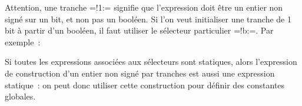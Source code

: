 Attention, une tranche \plm=!1:= signifie que l'expression doit être un entier non signé sur un bit, et non pas un booléen. Si l'on veut initialiser une tranche de 1 bit à partir d'un booléen, il faut utiliser le sélecteur particulier \plm=!b:=. Par exemple~:

Si toutes les expressions associées aux sélecteurs sont statiques, alors l'expression de construction d'un entier non signé par tranches est aussi une expression statique~: on peut donc utiliser cette construction pour définir des constantes globales.



